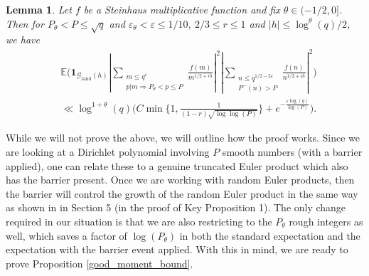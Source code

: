 \documentclass[reqno]{amsart}
\newtheorem{lemma}{Lemma}
\theoremstyle{definition}
\theoremstyle{remark}
\numberwithin{equation}{section}
\theoremstyle{remark}
\begin{document}
\begin{lemma}
    Let $f$ be a Steinhaus multiplicative function and fix $\theta \in (-1/2,0]$. Then for $P_\theta < P \leq \sqrt{q}$ and $\varepsilon_\theta < \varepsilon \leq 1/10$, $2/3 \leq r \leq 1$ and $|h| \leq \log^\theta(q)/2$, we have
    \begin{align*}
        &\mathbb{E}\big(\mathbf{1}_{\mathcal{G}_{\text{rand}}(h)}|\sum_{\substack{m \leq q^\varepsilon \\ p|m \Rightarrow P_\theta < p \leq P}}\frac{f(m)}{m^{1/2+ih}}|^2|\sum_{\substack{n \leq q^{1/2-2\varepsilon} \\ P^-(n) > P}}\frac{f(n)}{n^{1/2+ih}}|^2\big) \\ &\ll \log^{1+\theta}(q)\big(C\min\big\{1,\frac{1}{(1-r)\sqrt{\log\log(P)}}\big\}+e^{-\frac{\varepsilon\log(q)}{\log(P)}}\big).
    \end{align*} \label{log_cor_barrier_moment}
\end{lemma}
While we will not prove the above, we will outline how the proof works. Since we are looking at a Dirichlet polynomial involving $P$ smooth numbers (with a barrier applied), one can relate these to a genuine truncated Euler product which also has the barrier present. Once we are working with random Euler products, then the barrier will control the growth of the random Euler product in the same way as shown in \cite{aharper201} in Section 5 (in the proof of Key Proposition 1). The only change required in our situation is that we are also restricting to the $P_\theta$ rough integers as well, which saves a factor of $\log(P_\theta)$ in both the standard expectation and the expectation with the barrier event applied. With this in mind, we are ready to prove Proposition \ref{good_moment_bound}.
\end{document}
